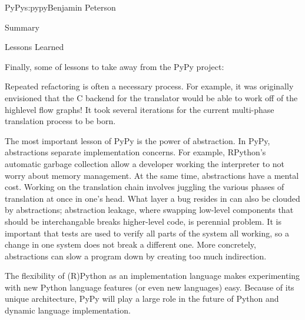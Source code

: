 \begin{aosachapter}{PyPy}{s:pypy}{Benjamin Peterson}
\begin{aosasect1}{Summary}
\end{aosasect1}

\begin{aosasect1}{Lessons Learned}

Finally, some of lessons to take away from the PyPy project:

Repeated refactoring is often a necessary process. For example, it was
originally envisioned that the C backend for the translator would be able to
work off of the highlevel flow graphs! It took several iterations for the
current multi-phase translation process to be born.

The most important lesson of PyPy is the power of abstraction. In PyPy,
abstractions separate implementation concerns. For example, RPython's automatic
garbage collection allow a developer working the interpreter to not worry about
memory management. At the same time, abstractions have a mental cost. Working on
the translation chain involves juggling the various phases of translation at
once in one's head. What layer a bug resides in can also be clouded by
abstractions; abstraction leakage, where swapping low-level components that
should be interchangable breaks higher-level code, is perennial problem. It is
important that tests are used to verify all parts of the system all working, so
a change in one system does not break a different one. More concretely,
abstractions can slow a program down by creating too much indirection.

The flexibility of (R)Python as an implementation language makes experimenting
with new Python language features (or even new languages) easy. Because of its
unique architecture, PyPy will play a large role in the future of Python and
dynamic language implementation.

\end{aosasect1}

\end{aosachapter}
